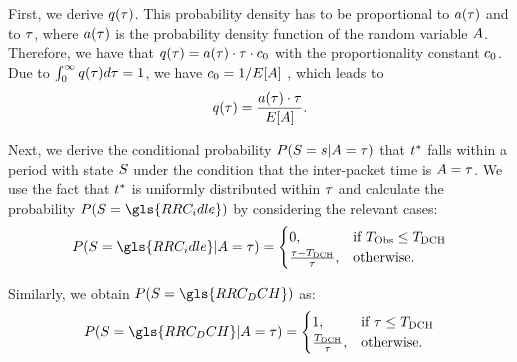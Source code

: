First, we derive \(q(\tau)\).
This probability density has to be proportional to \(a(\tau)\) and to \(\tau\), where \(a(\tau)\) is the probability density function of the random variable \(A\).
Therefore, we have that
\(q(\tau)=a(\tau)\cdot\tau\cdot c_0\)
with the proportionality constant \(c_0\).
Due to
\(\int_0^\infty q(\tau)d\tau=1\),
we have
\(c_0=1/E[A]\)
, which leads to
\begin{equation*}
q(\tau)=\frac{a(\tau) \cdot \tau}{E[A]}.
\label{eq:network:performance_model:system_description:state_distribution:observation_density}
\end{equation*}

Next, we derive the conditional probability
\(P(S=s \vert A = \tau)\)
that \(t^*\) falls within a period with state \(S\) under the condition that the inter-packet time is
\(A = \tau\).
We use the fact that \(t^*\) is uniformly distributed within \(\tau\) and calculate the probability
\(P(\RRCState = \gls{RRC_idle})\)
by considering the relevant cases:
\begin{equation}
P(\RRCState=\gls{RRC_idle}\vert \PacketIAT = \ObservationIntervalLength)=
\begin{cases}
	0,  & \mbox{if } \ObservationInterval \leq \TDCH \\
    \frac{\ObservationIntervalLength - \TDCH}{\ObservationIntervalLength}, & \mbox{otherwise.}
\end{cases}
\end{equation}

Similarly, we obtain \(P(\RRCState = \gls{RRC_DCH})\) as:
\begin{equation}
P(\RRCState=\gls{RRC_DCH} \vert \PacketIAT = \ObservationIntervalLength)=
\begin{cases}
	1,  & \mbox{if } \ObservationIntervalLength \leq \TDCH \\
    \frac{\TDCH}{\ObservationIntervalLength}, & \mbox{otherwise.}
\end{cases}
\label{eq:network:performance_model:system_description:state_distribution:conditional_probability_dch}
\end{equation}


